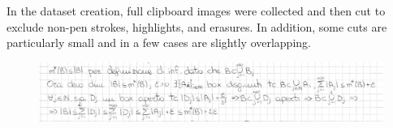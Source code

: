 In the dataset creation, full clipboard images were collected and then cut to exclude non-pen strokes, highlights, and erasures. In addition, some cuts are particularly small and in a few cases are slightly overlapping.

\begin{figure}[h]
    \centering
    \includegraphics[width=\linewidth]{Figures/Author1_0001_02.png}
\end{figure}
